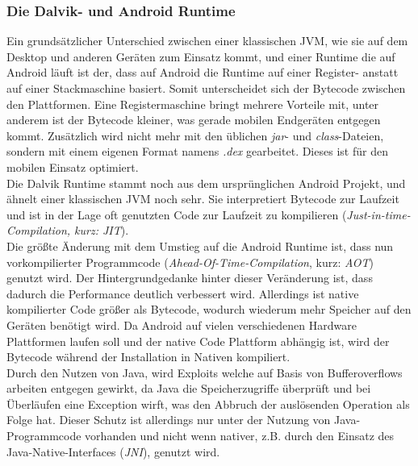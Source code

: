 \subsubsection{Die Dalvik- und Android Runtime}
	Ein grundsätzlicher Unterschied zwischen einer klassischen JVM, wie sie auf dem Desktop und anderen Geräten zum Einsatz kommt, und einer Runtime die auf Android läuft ist der, dass auf Android die Runtime auf einer Register- anstatt auf einer Stackmaschine basiert\cite{DalvikBytecode}. Somit unterscheidet sich der Bytecode zwischen den Plattformen. Eine Registermaschine bringt mehrere Vorteile mit, unter anderem ist der Bytecode kleiner, was gerade mobilen Endgeräten entgegen kommt.
	Zusätzlich wird nicht mehr mit den üblichen \textit{jar}- und \textit{class}-Dateien, sondern mit einem eigenen Format namens \textit{.dex} gearbeitet\cite{DexFormat}. Dieses ist für den mobilen Einsatz optimiert.\\
	Die Dalvik Runtime stammt noch aus dem ursprünglichen Android Projekt, und ähnelt einer klassischen JVM noch sehr. Sie interpretiert Bytecode zur Laufzeit und ist in der Lage oft genutzten Code zur Laufzeit zu kompilieren (\textit{Just-in-time-Compilation, kurz: JIT}). \\
	Die größte Änderung mit dem Umstieg auf die Android Runtime ist, dass nun vorkompilierter Programmcode (\textit{Ahead-Of-Time-Compilation}, kurz: \textit{AOT}) genutzt wird. Der Hintergrundgedanke hinter dieser Veränderung ist, dass dadurch die Performance deutlich verbessert wird. Allerdings ist native kompilierter Code größer als Bytecode, wodurch wiederum mehr Speicher auf den Geräten benötigt wird.
	Da Android auf vielen verschiedenen Hardware Plattformen laufen soll und der native Code Plattform abhängig ist, wird der Bytecode während der Installation in Nativen kompiliert.\\
	Durch den Nutzen von Java, wird Exploits welche auf Basis von Bufferoverflows arbeiten entgegen gewirkt, da Java die Speicherzugriffe überprüft und bei Überläufen eine Exception wirft, was den Abbruch der auslösenden Operation als Folge hat. Dieser Schutz ist allerdings nur unter der Nutzung von Java-Programmcode vorhanden und nicht wenn nativer, z.B. durch den Einsatz des Java-Native-Interfaces (\textit{JNI}), genutzt wird.